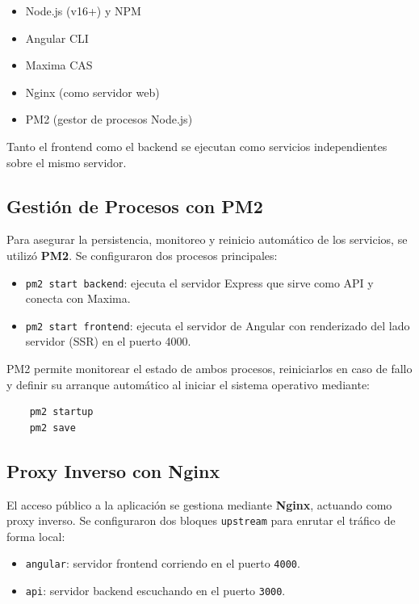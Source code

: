 \begin{itemize}
	\item Node.js (v16+) y NPM
	\item Angular CLI
	\item Maxima CAS
	\item Nginx (como servidor web)
	\item PM2 (gestor de procesos Node.js)
\end{itemize}

Tanto el frontend como el backend se ejecutan como servicios independientes sobre el mismo servidor.

\subsection{Gestión de Procesos con PM2}

Para asegurar la persistencia, monitoreo y reinicio automático de los servicios, se utilizó \textbf{PM2}. Se configuraron dos procesos principales:

\begin{itemize}
	\item \texttt{pm2 start backend}: ejecuta el servidor Express que sirve como API y conecta con Maxima.
	\item \texttt{pm2 start frontend}: ejecuta el servidor de Angular con renderizado del lado servidor (SSR) en el puerto 4000.
\end{itemize}

PM2 permite monitorear el estado de ambos procesos, reiniciarlos en caso de fallo y definir su arranque automático al iniciar el sistema operativo mediante:

\begin{verbatim}
	pm2 startup
	pm2 save
\end{verbatim}

\subsection{Proxy Inverso con Nginx}

El acceso público a la aplicación se gestiona mediante \textbf{Nginx}, actuando como proxy inverso. Se configuraron dos bloques \texttt{upstream} para enrutar el tráfico de forma local:

\begin{itemize}
	\item \texttt{angular}: servidor frontend corriendo en el puerto \texttt{4000}.
	\item \texttt{api}: servidor backend escuchando en el puerto \texttt{3000}.
\end{itemize}

